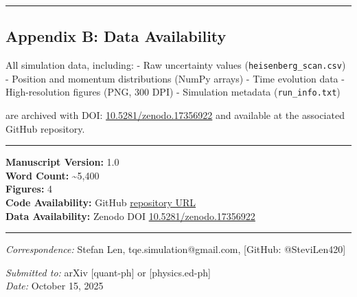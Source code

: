 \documentclass[
  11pt,
]{article}
\begin{document}
\begin{center}\rule{0.5\linewidth}{0.5pt}\end{center}

\subsection{Appendix B: Data
Availability}\label{appendix-b-data-availability}

All simulation data, including: - Raw uncertainty values
(\texttt{heisenberg\_scan.csv}) - Position and momentum distributions
(NumPy arrays) - Time evolution data - High-resolution figures (PNG, 300
DPI) - Simulation metadata (\texttt{run\_info.txt})

are archived with DOI:
\href{https://doi.org/10.5281/zenodo.17356922}{10.5281/zenodo.17356922}
and available at the associated GitHub repository.

\begin{center}\rule{0.5\linewidth}{0.5pt}\end{center}

\textbf{Manuscript Version:} 1.0\\
\textbf{Word Count:} \textasciitilde5,400\\
\textbf{Figures:} 4\\
\textbf{Code Availability:} GitHub
\href{https://github.com/SteviLen420/Heisenberg_Uncertainty_Simulation}{repository
URL}\\
\textbf{Data Availability:} Zenodo DOI
\href{https://doi.org/10.5281/zenodo.17356922}{10.5281/zenodo.17356922}

\begin{center}\rule{0.5\linewidth}{0.5pt}\end{center}

\emph{Correspondence:} Stefan Len, tqe.simulation@gmail.com, {[}GitHub:
@SteviLen420{]}

\emph{Submitted to:} arXiv {[}quant-ph{]} or {[}physics.ed-ph{]}\\
\emph{Date:} October 15, 2025
\end{document}
